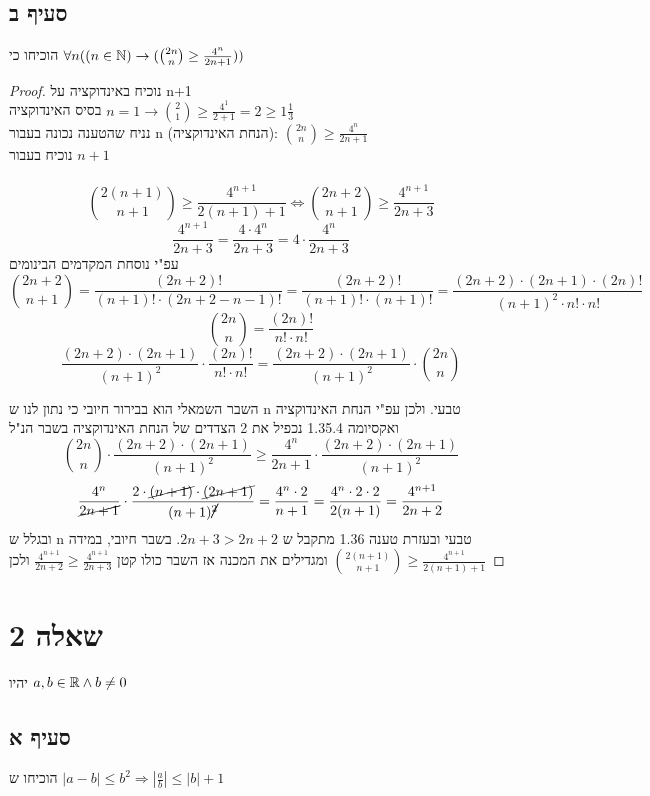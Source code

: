 \documentclass{article}
\begin{document}
	\subsection*{סעיף ב}
הוכיחו כי
	 $\forall n( (n \in \mathbb{N}) \to ( {2n \choose n} \geq \frac{4^n}{2n+1} ) )$
	\begin{proof}
נוכיח באינדוקציה על n+1 \\
בסיס האינדוקציה
		$n = 1 \to {2 \choose 1} \geq \frac{4^1}{2+1} = 2 \geq 1 \frac{1}{3}$ \\
נניח שהטענה נכונה בעבור n (הנחת האינדוקציה):
		${2n \choose n} \geq \frac{4^n}{2n+1}$ \\
נוכיח בעבור $n + 1$ \\
		\
		\[
			{2(n+1) \choose n+1} \geq \frac{4^{n+1}}{2(n+1)+1} \iff
			{2n + 2 \choose n + 1} \geq \frac{4^{n+1}}{2n + 3}
		\]
		\[ \frac{4^{n+1}}{2n + 3} = \frac{4 \cdot 4^n}{2n+3} = 4 \cdot \frac{4^n}{2n+3} \]
עפ"י נוסחת המקדמים הבינומים
		\[
			{2n + 2 \choose n + 1} = \frac{(2n+2)!}{(n+1)! \cdot (2n+2-n-1)!} =
			\frac{(2n+2)!}{(n+1)! \cdot (n+1)!} =
			\frac{(2n+2) \cdot (2n+1) \cdot (2n)!}{(n+1)^2 \cdot n! \cdot n!}
		\]
		\[ {2n \choose n}  = \frac{(2n)!}{n! \cdot n!} \]
		\[
			\frac{(2n+2) \cdot (2n+1)}{(n+1)^2} \cdot \frac{(2n)!}{n! \cdot n!} =
			\frac{(2n+2) \cdot (2n+1)}{(n+1)^2} \cdot {2n \choose n}
		\]

השבר השמאלי הוא בבירור חיובי כי נתון לנו ש n טבעי. ולכן עפ"י הנחת האינדוקציה ואקסיומה 1.35.4 נכפיל את 2 הצדדים של הנחת האינדוקציה בשבר הנ"ל
		\[
			{2n \choose n} \cdot \frac{(2n+2) \cdot (2n+1)}{(n+1)^2} \geq
			\frac{4^n}{2n+1} \cdot \frac{(2n+2) \cdot (2n+1)}{(n+1)^2}
		\]
		\[
			\frac{4^n}{\cancel{2n+1}} \cdot \frac{2 \cdot \cancel{(n+1)} \cdot \cancel{(2n+1)}}{(n+1)\cancel{^2}} =
			\frac{4^n \cdot 2}{n+1} =
			\frac{4^n \cdot 2 \cdot 2}{2(n+1)} =
			\frac{4^{n+1}}{2n+2}
		\]
		ובגלל ש n טבעי ובעזרת טענה 1.36 מתקבל ש
		$2n + 3 > 2n + 2$.
		בשבר חיובי, במידה ומגדילים את המכנה אז השבר כולו קטן
		$\frac{4^{n+1}}{2n+2} \geq \frac{4^{n+1}}{2n+3}$
		ולכן
		${2(n+1) \choose n+1} \geq \frac{4^{n+1}}{2(n+1)+1}$


	\end{proof}

	\section*{שאלה 2}
	יהיו
	$a,b \in \mathbb{R} \land b \neq 0$
	\subsection*{סעיף א}
	הוכיחו ש
	$|a-b| \leq b^2 \Rightarrow |\frac{a}{b}| \leq |b| + 1$
\end{document}
